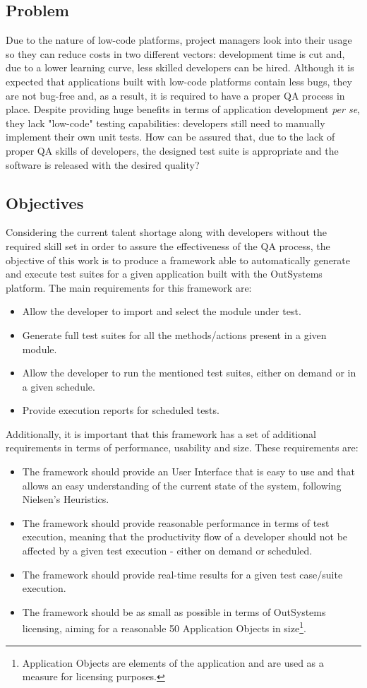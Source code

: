 \documentclass{sigchi}
\begin{document}
\subsection{Problem}
Due to the nature of low-code platforms, project managers look into their usage so they can reduce costs in two different vectors: development time is cut and, due to a lower learning curve, less skilled developers can be hired. Although it is expected that applications built with low-code platforms contain less bugs, they are not bug-free and, as a result, it is required to have a proper QA process in place. Despite providing huge benefits in terms of application development \textit{per se}, they lack "low-code" testing capabilities: developers still need to manually implement their own unit tests. How can be assured that, due to the lack of proper QA skills of developers, the designed test suite is appropriate and the software is released with the desired quality? 
\subsection{Objectives}
Considering the current talent shortage along with developers without the required skill set in order to assure the effectiveness of the QA process, the objective of this work is to produce a framework able to automatically generate and execute test suites for a given application built with the OutSystems platform. The main requirements for this framework are:
\begin{itemize}
    \item Allow the developer to import and select the module under test.
    \item Generate full test suites for all the methods/actions present in a given module.
    \item Allow the developer to run the mentioned test suites, either on demand or in a given schedule.
    \item Provide execution reports for scheduled tests.
\end{itemize}
Additionally, it is important that this framework has a set of additional requirements in terms of performance, usability and size. These requirements are:
\begin{itemize}
    \item The framework should provide an User Interface that is easy to use and that allows an easy understanding of the current state of the system, following Nielsen's Heuristics\cite{Nielsen:1994:EEP:191666.191729}.
    \item The framework should provide reasonable performance in terms of test execution, meaning that the productivity flow of a developer should not be affected by a given test execution - either on demand or
    scheduled.
    \item The framework should provide real-time results for a given test case/suite execution.
    \item The framework should be as small as possible in terms of OutSystems licensing, aiming for a reasonable 50 Application Objects in size\footnote{Application Objects are elements of the application and are used as a measure for licensing purposes.}.
\end{itemize}
\end{document}
